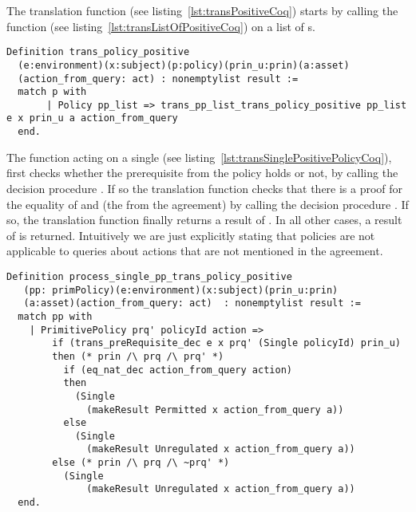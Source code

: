 \newpage

The  translation function (see listing~\ref{lst:transPositiveCoq}) starts by calling the function  (see listing~\ref{lst:transListOfPositiveCoq}) on a list of s.
 
\begin{minipage}{\linewidth}
\begin{lstlisting}
Definition trans_policy_positive
  (e:environment)(x:subject)(p:policy)(prin_u:prin)(a:asset)
  (action_from_query: act) : nonemptylist result :=
  match p with
       | Policy pp_list => trans_pp_list_trans_policy_positive pp_list e x prin_u a action_from_query
  end.
\end{lstlisting}
\end{minipage}

The function  acting on a single  (see listing~\ref{lst:transSinglePositivePolicyCoq}), first checks whether the prerequisite from the policy holds or not, by calling the decision procedure . If so the translation function checks that there is a proof for the equality of  and  (the  from the agreement) by calling the decision procedure . If so, the translation function finally returns a result of . In all other cases, a result of  is returned. Intuitively we are just explicitly stating that policies are not applicable to queries about actions that are not mentioned in the agreement. 


\begin{minipage}{\linewidth}
\begin{lstlisting}
Definition process_single_pp_trans_policy_positive 
   (pp: primPolicy)(e:environment)(x:subject)(prin_u:prin)
   (a:asset)(action_from_query: act)  : nonemptylist result :=
  match pp with
    | PrimitivePolicy prq' policyId action =>
        if (trans_preRequisite_dec e x prq' (Single policyId) prin_u)
        then (* prin /\ prq /\ prq' *)
          if (eq_nat_dec action_from_query action)
          then
            (Single 
              (makeResult Permitted x action_from_query a))
          else
            (Single 
              (makeResult Unregulated x action_from_query a))
        else (* prin /\ prq /\ ~prq' *)
          (Single 
              (makeResult Unregulated x action_from_query a))
  end.
\end{lstlisting}
\end{minipage}

